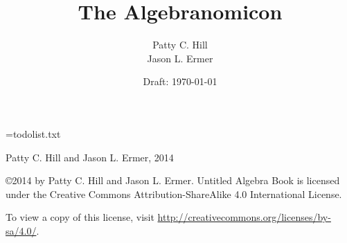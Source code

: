 \documentclass[oneside, openany]{book}
\providecommand\phantomsection{}
\begin{document}
\newwrite\outputstream
\immediate\openout\outputstream=todolist.txt


\title{{\Huge\textbf{The Algebranomicon}}}
\author{Patty C. Hill \\ Jason L. Ermer}
\date{Draft: \today}

\maketitle

\pagestyle{empty}
\null\vfill\noindent
{} Patty C. Hill and Jason L. Ermer, 2014

\copyright{2014} by Patty C. Hill and Jason L. Ermer. Untitled Algebra Book is licensed under the Creative Commons Attribution-ShareAlike 4.0 International License.

To view a copy of this license, visit \url{http://creativecommons.org/licenses/by-sa/4.0/}.
\clearpage

\frontmatter
\pagestyle{plain}

\setcounter{tocdepth}{1}
\tableofcontents



\mainmatter
\pagestyle{fancy}

\lhead{}
\rhead{\leftmark}
\cfoot{\thepage}



%
















\end{document}
